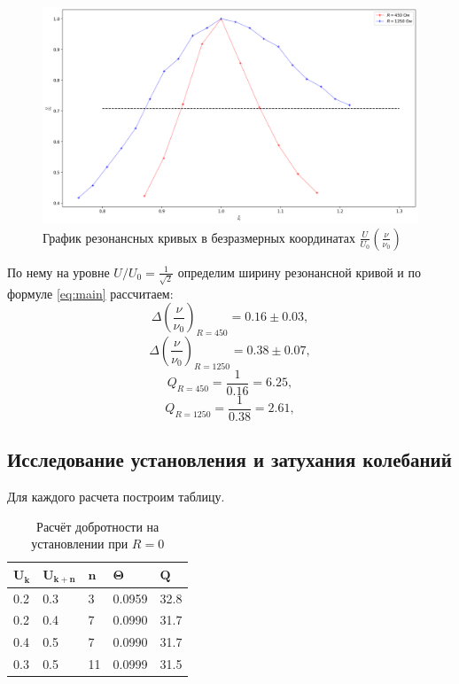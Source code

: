 \documentclass{lab}
\begin{document}
\begin{figure}[bth]
    \centering
    \includegraphics[width=1\linewidth]{G3}
    \caption{График резонансных кривых в безразмерных координатах $\frac{U}{U_0}(\frac{\nu}{\nu_0})$}
    \label{fig:graph}
\end{figure}
По нему на уровне $ U/U_0 = \frac{1}{\sqrt{2}}  $ определим ширину резонансной кривой и по формуле \eqref{eq:main} рассчитаем:
\begin{equation*}
    \Delta (\frac{\nu}{\nu_0})_{R=450} = 0.16 \pm 0.03,
\end{equation*}
\begin{equation*}
    \Delta (\frac{\nu}{\nu_0})_{R=1250} = 0.38 \pm 0.07 ,
\end{equation*}
\begin{equation}
    Q_{R=450} = \frac{1}{0.16} = 6.25,
\end{equation}
\begin{equation}
    Q_{R=1250} = \frac{1}{0.38} = 2.61,
\end{equation}

\subsection{Исследование установления и затухания колебаний}

Для каждого расчета построим таблицу.

\begin{table}[h!]
    \centering
    \begin{tabular}{|l|l|l|l|l|}
        \hline
        $\mathbf{U_k}$ & $\mathbf{U_{k+n}}$ & $\mathbf{n}$ & $\mathbf{\Theta}$ & $\mathbf{Q}$  \\ \hline
        0.2   & 0.3     & 3   & 0.0959   & 32.8 \\ \hline
        0.2   & 0.4     & 7   & 0.0990   & 31.7 \\ \hline
        0.4   & 0.5     & 7   & 0.0990   & 31.7 \\ \hline
        0.3   & 0.5     & 11  & 0.0999   & 31.5 \\ \hline
    \end{tabular}
    \caption{Расчёт добротности на установлении при $R=0$}
\end{table}
\end{document}
